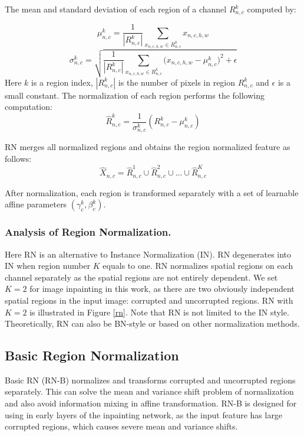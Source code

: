 \documentclass[letterpaper]{article} %
\begin{document}
The mean and standard deviation of each region of a channel $R_{n,c}^{k}$ computed by:

\begin{equation}
\mu_{n,c}^{k}=\frac{1}{|R_{n,c}^{k}|}\sum_{x_{n,c,h,w} \in {R_{n,c}^{k}}}x_{n,c,h,w}
\end{equation}
\begin{equation}
\sigma_{n,c}^{k}=\sqrt{\frac{1}{|R_{n,c}^{k}|}\sum_{x_{n,c,h,w} \in {R_{n,c}^{k}}}{(x_{n,c,h,w}-\mu_{n,c}^{k}})^2+\epsilon}
\end{equation}
Here $k$ is a region index, ${|R_{n,c}^{k}|}$ is the number of pixels in region ${R_{n,c}^{k}}$ and $\epsilon$ is a small constant. The normalization of each region performs the following computation:
\begin{equation}
\hat R_{n,c}^{k} =\frac{1}{\sigma_{n,c}^{k}}(R_{n,c}^{k}-\mu_{n,c}^{k})
\end{equation}

RN merges all normalized regions and obtains the region normalized feature as follows:
\begin{equation}
\hat X_{n,c}={\hat R_{n,c}^{1} \cup \hat R_{n,c}^{2} \cup ... \cup \hat R_{n,c}^{K}}
\end{equation}

After normalization, each region is transformed separately with a set of learnable affine parameters $(\gamma_c^k, \beta_c^k)$.

\subsubsection{Analysis of Region Normalization.}
Here RN is an alternative to Instance Normalization (IN). RN degenerates into IN when region number $K$ equals to one. RN normalizes spatial regions on each channel separately as the spatial regions are not entirely dependent. We set $K=2$ for image inpainting in this work, as there are two obviously independent spatial regions in the input image: corrupted and uncorrupted regions. RN with $K=2$ is illustrated in Figure \ref{rn}. Note that RN is not limited to the IN style. Theoretically, RN can also be BN-style or based on other normalization methods.


\subsection{Basic Region Normalization}
Basic RN (RN-B) normalizes and transforms corrupted and uncorrupted regions separately. This can solve the mean and variance shift problem of normalization and also avoid information mixing in affine transformation. RN-B is designed for using in early layers of the inpainting network, as the input feature has large corrupted regions, which causes severe mean and variance shifts.
\end{document}

